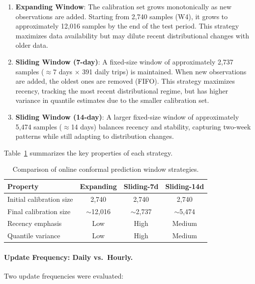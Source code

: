 \begin{enumerate}
    \item \textbf{Expanding Window}: The calibration set grows monotonically as new observations are added. Starting from 2,740 samples (W4), it grows to approximately 12,016 samples by the end of the test period. This strategy maximizes data availability but may dilute recent distributional changes with older data.

    \item \textbf{Sliding Window (7-day)}: A fixed-size window of approximately 2,737 samples ($\approx$7 days $\times$ 391 daily trips) is maintained. When new observations are added, the oldest ones are removed (FIFO). This strategy maximizes recency, tracking the most recent distributional regime, but has higher variance in quantile estimates due to the smaller calibration set.

    \item \textbf{Sliding Window (14-day)}: A larger fixed-size window of approximately 5,474 samples ($\approx$14 days) balances recency and stability, capturing two-week patterns while still adapting to distribution changes.
\end{enumerate}

Table~\ref{tab:window_comparison} summarizes the key properties of each strategy.

\begin{table}[htbp]
\centering
\caption{Comparison of online conformal prediction window strategies.}
\label{tab:window_comparison}
\begin{tabular}{lccc}
\toprule
\textbf{Property} & \textbf{Expanding} & \textbf{Sliding-7d} & \textbf{Sliding-14d} \\
\midrule
Initial calibration size & 2,740 & 2,740 & 2,740 \\
Final calibration size & $\sim$12,016 & $\sim$2,737 & $\sim$5,474 \\
Recency emphasis & Low & High & Medium \\
Quantile variance & Low & High & Medium \\
\bottomrule
\end{tabular}
\end{table}

\paragraph{Update Frequency: Daily vs.\ Hourly.}
Two update frequencies were evaluated:

